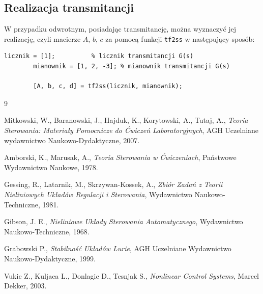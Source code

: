 \documentclass{article}
\begin{document}
    \subsection{Realizacja transmitancji}
    W przypadku odwrotnym, posiadając transmitancję, można wyznaczyć jej realizację, czyli macierze $A$, $b$, $c$ za pomocą funkcji \texttt{tf2ss} w następujący sposób:
    \begin{lstlisting}[style=Matlab-editor]
        licznik = [1];          % licznik transmitancji G(s)
        mianownik = [1, 2, -3]; % mianownik transmitancji G(s)
        
        [A, b, c, d] = tf2ss(licznik, mianownik);
    \end{lstlisting}

\newpage
\begin{thebibliography}{9}

  Mitkowski, W., Baranowski, J., Hajduk, K., Korytowski, A., Tutaj, A.,
  \emph{Teoria Sterowania: Materiały Pomocnicze do Ćwiczeń Laboratoryjnych},
  AGH Uczelniane wydawnictwo Naukowo-Dydaktyczne,
  2007.

  Amborski, K., Marusak, A.,
  \emph{Teoria Sterowania w Ćwiczeniach},
  Państwowe Wydawnictwo Naukowe,
  1978.

  Gessing, R., Latarnik, M., Skrzywan-Kossek, A.,
  \emph{Zbiór Zadań z Teorii Nieliniowych Układów Regulacji i Sterowania},
  Wydawnictwo Naukowo-Techniczne,
  1981.

  Gibson, J. E.,
  \emph{Nieliniowe Układy Sterowania Automatycznego},
  Wydawnictwo Naukowo-Techniczne,
  1968.

  Grabowski P.,
  \emph{Stabilność Układów Lurie},
  AGH Uczelniane Wydawnictwo Naukowo-Dydaktyczne,
  1999.


  Vukic Z., Kuljaca L., Donlagic D., Tesnjak S.,
  \emph{Nonlinear Control Systems},
  Marcel Dekker,
  2003.

\end{thebibliography}
\end{document}
